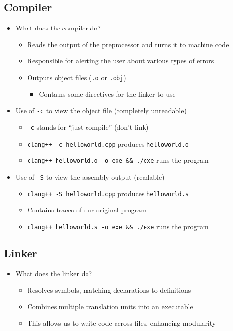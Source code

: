 \documentclass{article}
\begin{document}
\subsection{Compiler}

\begin{itemize}
	\item What does the compiler do? \begin{itemize}
		\item Reads the output of the preprocessor and turns it to machine code
		\item Responsible for alerting the user about various types of errors
		\item Outputs object files (\texttt{.o} or \texttt{.obj}) \begin{itemize}
			\item Contains some directives for the linker to use
		\end{itemize}
	\end{itemize}
	\item Use of \texttt{-c} to view the object file (completely unreadable)\begin{itemize}
		\item \texttt{-c} stands for ``just compile'' (don't link)
		\item \texttt{clang++ -c helloworld.cpp} produces \texttt{helloworld.o}
		\item \texttt{clang++ helloworld.o -o exe \&\& ./exe} runs the program
	\end{itemize}
	\item Use of \texttt{-S} to view the assembly output (readable)\begin{itemize}
		\item \texttt{clang++ -S helloworld.cpp} produces \texttt{helloworld.s}
		\item Contains traces of our original program
		\item \texttt{clang++ helloworld.s -o exe \&\& ./exe} runs the program
	\end{itemize}
\end{itemize}

\subsection{Linker}

\begin{itemize}
	\item What does the linker do? \begin{itemize}
		\item Resolves symbols, matching declarations to definitions
		\item Combines multiple translation units into an executable
		\item This allows us to write code across files, enhancing modularity
	\end{itemize}
\end{itemize}
\end{document}
